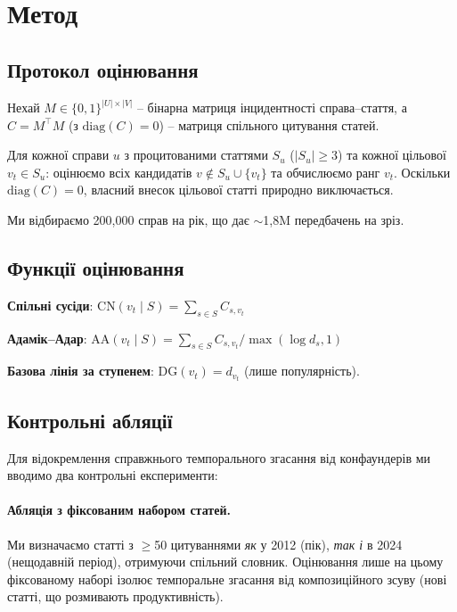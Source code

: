 \documentclass[11pt]{article}
\begin{document}
\section{Метод}
\label{sec:method}

\subsection{Протокол оцінювання}

Нехай $M \in \{0,1\}^{|U| \times |V|}$ – бінарна матриця інцидентності справа–стаття, а $C = M^\top M$ (з $\text{diag}(C) = 0$) – матриця спільного цитування статей.

Для кожної справи $u$ з процитованими статтями $S_u$ ($|S_u| \geq 3$) та кожної цільової $v_t \in S_u$:
оцінюємо всіх кандидатів $v \notin S_u \cup \{v_t\}$ та обчислюємо ранг $v_t$.
Оскільки $\text{diag}(C) = 0$, власний внесок цільової статті природно виключається.

Ми відбираємо 200{,}000 справ на рік, що дає $\sim$1,8M передбачень на зріз.

\subsection{Функції оцінювання}

\textbf{Спільні сусіди}: $\text{CN}(v_t \mid S) = \sum_{s \in S} C_{s, v_t}$

\textbf{Адамік–Адар}: $\text{AA}(v_t \mid S) = \sum_{s \in S} C_{s, v_t} / \max(\log d_s, 1)$

\textbf{Базова лінія за ступенем}: $\text{DG}(v_t) = d_{v_t}$ (лише популярність).

\subsection{Контрольні абляції}

Для відокремлення справжнього темпорального згасання від конфаундерів ми вводимо два контрольні експерименти:

\paragraph{Абляція з фіксованим набором статей.}
Ми визначаємо статті з $\geq$50 цитуваннями \emph{як} у 2012 (пік), \emph{так і} в 2024 (нещодавній період), отримуючи спільний словник.
Оцінювання лише на цьому фіксованому наборі ізолює темпоральне згасання від композиційного зсуву (нові статті, що розмивають продуктивність).
\end{document}
